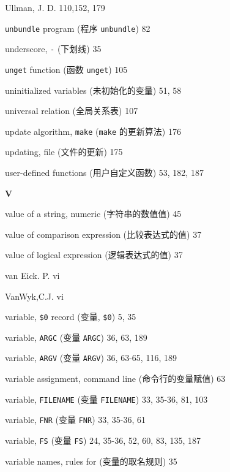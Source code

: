 \begin{multicols}{2}
\hangindent=2pc  Ullman, J. D. 110,152, 179

\hangindent=2pc  \verb'unbundle' program (程序 \verb'unbundle') 82

\hangindent=2pc  underscore, \verb'-' (下划线) 35

\hangindent=2pc  \verb'unget' function (函数 \verb'unget') 105

\hangindent=2pc  uninitialized variables (未初始化的变量) 51, 58

\hangindent=2pc  universal relation (全局关系表) 107

\hangindent=2pc  update algorithm, \verb'make' (\verb'make'
的更新算法) 176

\hangindent=2pc  updating, file (文件的更新) 175

\hangindent=2pc  user-defined functions (用户自定义函数) 
53, 182,  187

\medskip\textbf{\large{V}}

\hangindent=2pc  value of a string, numeric (字符串的数值值) 45

\hangindent=2pc  value of comparison expression (比较表达式的值) 37

\hangindent=2pc  value of logical expression (逻辑表达式的值) 37

\hangindent=2pc  van Eick. P. vi

\hangindent=2pc  VanWyk,C.J. vi

\hangindent=2pc  variable, \verb'$0' record (变量, \verb'$0') 5, 35

\hangindent=2pc  variable, \verb'ARGC' (变量 \verb'ARGC')
36, 63, 189

\hangindent=2pc  variable, \verb'ARGV' (变量 \verb'ARGV')
36, 63-65, 116, 189

\hangindent=2pc  variable assignment, command line
(命令行的变量赋值) 63

\hangindent=2pc  variable, \verb'FILENAME' (变量
\verb'FILENAME') 33, 35-36, 81, 103

\hangindent=2pc  variable, \verb'FNR' (变量 \verb'FNR') 33, 35-36, 61

\hangindent=2pc  variable, \verb'FS' (变量 \verb'FS')
24, 35-36, 52, 60, 83, 135, 187

\hangindent=2pc  variable names, rules for (变量的取名规则) 35


\end{multicols}
